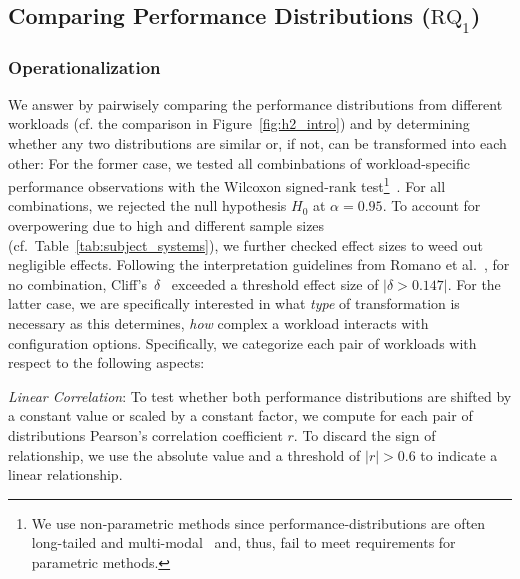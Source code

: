 {\subsection{Comparing Performance Distributions ($\text{RQ}_\text{1}$)}\label{sec:rq1}
\subsubsection{Operationalization}
We answer  by pairwisely comparing the performance distributions from different workloads (cf. the comparison in Figure~\ref{fig:h2_intro}) and by determining whether any two distributions are similar or, if not, can be transformed into each other: For the former case, we tested all combinbations of workload-specific performance observations with the Wilcoxon signed-rank test\footnote{We use non-parametric methods since performance-distributions are often long-tailed and multi-modal~\cite{curtsinger_stabilizer_2013,maricq2018taming} and, thus, fail to meet requirements for parametric methods.}~\cite{lovric_international_2010}. For all combinations, we rejected the null hypothesis $H_0$ at $\alpha=0.95$. To account for overpowering due to high and different sample sizes (cf.~Table~\ref{tab:subject_systems}), we further checked effect sizes to weed out negligible effects. Following the interpretation guidelines from Romano et al.~\cite{romano2006exploring}, for no combination, Cliff's~$\delta$~\cite{Cliff1993DominanceSO} exceeded a threshold effect size of $\vert\delta > 0.147\vert$.
For the latter case, we are specifically interested in what \textit{type} of transformation is necessary as this determines, \textit{how} complex a workload interacts with configuration options. Specifically, we categorize each pair of workloads with respect to the following aspects: 

\begin{compactenum}

	\item \textit{Linear Correlation}: To test whether both performance distributions are shifted by a constant value or scaled by a constant factor, we compute for each pair of distributions Pearson's correlation coefficient $r$. To discard the sign of relationship, we use the absolute value and a threshold of $\vert r\vert >0.6$ to indicate a linear relationship.
	

\end{compactenum}}
